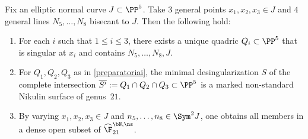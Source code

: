 \begin{prop}\label{preparatoria}
Fix an elliptic normal curve $J\subset\PP^5$. Take $3$ general points $x_1,x_2,x_3\in J$ and $4$ general lines $N_5,\ldots, N_8$ bisecant to $J$. Then the following hold:
\begin{enumerate}
\item\label{preparatoriai} For each $i$ such that $1\leq i\leq 3$, there exists a unique quadric $Q_i\subset\PP^5$ that is singular at $x_i$ and contains $N_5,\ldots, N_8, J$.
\item\label{preparatoriaii} For $Q_1,Q_2,Q_3$ as in \eqref{preparatoriai}, the minimal desingularization $S$ of the complete intersection $\overline{S'}:= Q_1\cap Q_2\cap Q_3\subset \PP^5$ is a marked non-standard Nikulin surface of genus~$21$.
\item\label{preparatoriaiii} By varying $x_1,x_2,x_3\in J$ and $n_5,\ldots,n_8\in \Sym^2J$, one obtains all members in a dense open subset of $\widehat{\F}_{21}^{\bN,\ns}$.
\end{enumerate}
\end{prop}

